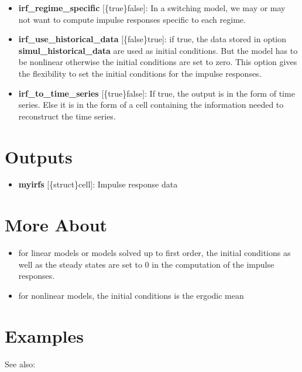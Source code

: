 \documentclass[letterpaper,10pt,english]{sphinxmanual}
\begin{document}
\begin{itemize}
\item {} 
\textbf{irf\_regime\_specific} {[}\{true\}\textbar{}false{]}: In a switching model, we may or
may not want to compute impulse responses specific to each regime.

\item {} 
\textbf{irf\_use\_historical\_data} {[}\{false\}\textbar{}true{]}: if true, the data stored in
option \textbf{simul\_historical\_data} are used as initial conditions. But
the model has to be nonlinear otherwise the initial conditions are set
to zero. This option gives the flexibility to set the initial
conditions for the impulse responses.

\item {} 
\textbf{irf\_to\_time\_series} {[}\{true\}\textbar{}false{]}: If true, the output is in the
form of time series. Else it is in the form of a cell containing the
information needed to reconstruct the time series.

\end{itemize}


\section{Outputs}
\label{classes/models/@rfvar/rfvar:id37}\begin{itemize}
\item {} 
\textbf{myirfs} {[}\{struct\}\textbar{}cell{]}: Impulse response data

\end{itemize}


\section{More About}
\label{classes/models/@rfvar/rfvar:id38}\begin{itemize}
\item {} 
for linear models or models solved up to first order, the initial
conditions as well as the steady states are set to 0 in the computation
of the impulse responses.

\item {} 
for nonlinear models, the initial conditions is the ergodic mean

\end{itemize}


\section{Examples}
\label{classes/models/@rfvar/rfvar:id39}
See also:
\end{document}
